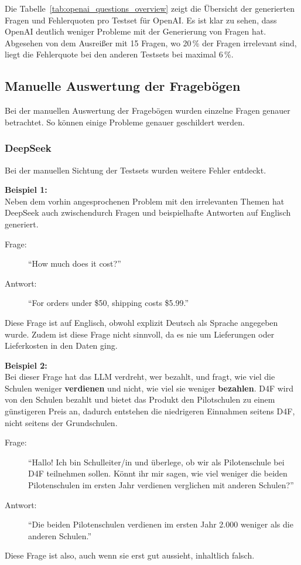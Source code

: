 Die Tabelle~\ref{tab:openai_questions_overview} zeigt die Übersicht der generierten Fragen und Fehlerquoten pro Testset für OpenAI.
Es ist klar zu sehen, dass OpenAI deutlich weniger Probleme mit der Generierung von Fragen hat.
Abgesehen von dem Ausreißer mit 15 Fragen, wo 20\,\% der Fragen irrelevant sind, liegt die Fehlerquote bei den anderen Testsets bei maximal 6\,\%.


\subsection{Manuelle Auswertung der Fragebögen}\label{subsec:manuelle-auswertung-der-fragebogen}

Bei der manuellen Auswertung der Fragebögen wurden einzelne Fragen genauer betrachtet.
So können einige Probleme genauer geschildert werden.

\subsubsection{DeepSeek}

Bei der manuellen Sichtung der Testsets wurden weitere Fehler entdeckt.

\textbf{Beispiel 1:}\\
Neben dem vorhin angesprochenen Problem mit den irrelevanten Themen hat DeepSeek auch zwischendurch Fragen und beispielhafte Antworten auf Englisch generiert.
\begin{description}
    \item[Frage:] \enquote{How much does it cost?}
    \item[Antwort:] \enquote{For orders under \$50, shipping costs \$5.99.}
\end{description}

Diese Frage ist auf Englisch, obwohl explizit Deutsch als Sprache angegeben wurde. Zudem ist diese Frage nicht sinnvoll, da es nie um Lieferungen oder Lieferkosten in den Daten ging.

\textbf{Beispiel 2:}\\
Bei dieser Frage hat das LLM verdreht, wer bezahlt, und fragt, wie viel die Schulen weniger \textbf{verdienen} und nicht, wie viel sie weniger \textbf{bezahlen}.
D4F wird von den Schulen bezahlt und bietet das Produkt den Pilotschulen zu einem günstigeren Preis an, dadurch entstehen die niedrigeren Einnahmen seitens D4F, nicht seitens der Grundschulen.

\begin{description}
    \item[Frage:] \enquote{Hallo! Ich bin Schulleiter/in und überlege, ob wir als Pilotenschule bei D4F teilnehmen sollen. Könnt ihr mir sagen, wie viel weniger die beiden Pilotenschulen im ersten Jahr verdienen verglichen mit anderen Schulen?}\\
    \item[Antwort:] \enquote{Die beiden Pilotenschulen verdienen im ersten Jahr 2.000 \texteuro{} weniger als die anderen Schulen.}
\end{description}
Diese Frage ist also, auch wenn sie erst gut aussieht, inhaltlich falsch.

